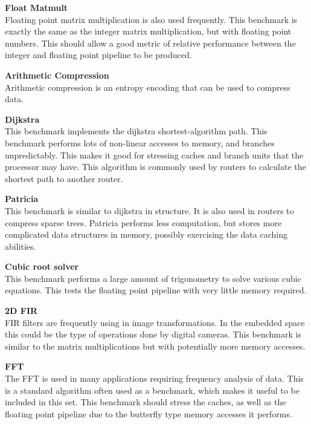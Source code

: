 \documentclass[twocolumn]{article}
\begin{document}
\vspace{3mm}
\textbf{Float Matmult}\\
Floating point matrix multiplication is also used frequently. This benchmark is exactly the same as the integer matrix multiplication, but with floating point numbers. This should allow a good metric of relative performance between the integer and floating point pipeline to be produced.

\vspace{3mm}
\textbf{Arithmetic Compression}\\
Arithmetic compression is an entropy encoding that can be used to compress data.

\vspace{3mm}
\textbf{Dijkstra}\\
This benchmark implements the dijkstra shortest-algorithm path. This benchmark performs lots of non-linear accesses to memory, and branches unpredictably. This makes it good for stressing caches and branch units that the processor may have. This algorithm is commonly used by routers to calculate the shortest path to another router.

\vspace{3mm}
\textbf{Patricia}\\
This benchmark is similar to dijkstra in structure. It is also used in routers to compress sparse trees. Patricia performs less computation, but stores more complicated data structures in memory, possibly exercising the data caching abilities.

\vspace{3mm}
\textbf{Cubic root solver}\\
This benchmark performs a large amount of trigonometry to solve various cubic equations. This tests the floating point pipeline with very little memory required.

\vspace{3mm}
\textbf{2D FIR}\\
FIR filters are frequently using in image transformations. In the embedded space this could be the type of operations done by digital cameras. This benchmark is similar to the matrix multiplications but with potentially more memory accesses.

\vspace{3mm}
\textbf{FFT}\\
The FFT is used in many applications requiring frequency analysis of data. This is a standard algorithm often used as a benchmark, which makes it useful to be included in this set. This benchmark should stress the caches, as well as the floating point pipeline due to the butterfly type memory accesses it performs.
\end{document}
